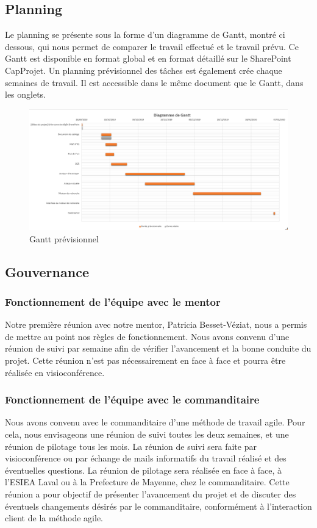 \subsection{Planning}
Le planning se présente sous la forme d'un diagramme de Gantt, montré ci dessous, qui nous permet de comparer le travail effectué et le travail prévu.
Ce Gantt est disponible en format global et en format détaillé sur le SharePoint CapProjet.
Un planning prévisionnel des tâches est également crée chaque semaines de travail.
Il est accessible dans le même document que le Gantt, dans les onglets.

\begin{figure}[h!]
	\includegraphics[width=\linewidth]{images/gantt.png}
	\caption{Gantt prévisionnel}
	\label{fig:MC}
\end{figure}		


\subsection{Gouvernance}
\subsubsection{Fonctionnement de l'équipe avec le mentor}
Notre première réunion avec notre mentor, Patricia Besset-Véziat, nous a permis de mettre au point nos règles de fonctionnement.
Nous avons convenu d'une réunion de suivi par semaine afin de vérifier l'avancement et la bonne conduite du projet.
Cette réunion n'est pas nécessairement en face à face et pourra être réalisée en visioconférence.


\subsubsection{Fonctionnement de l'équipe avec le commanditaire}
Nous avons convenu avec le commanditaire d'une méthode de travail agile.
Pour cela, nous envisageons une réunion de suivi toutes les deux semaines, et une réunion de pilotage tous les mois.
La réunion de suivi sera faite par visioconférence ou par échange de mails informatifs du travail réalisé et des éventuelles questions.
La réunion de pilotage sera réalisée en face à face, à l'ESIEA Laval ou à la Prefecture de Mayenne, chez le commanditaire.
Cette réunion a pour objectif de présenter l'avancement du projet et de discuter des éventuels changements désirés par le commanditaire, conformément à l'interaction client de la méthode agile.


